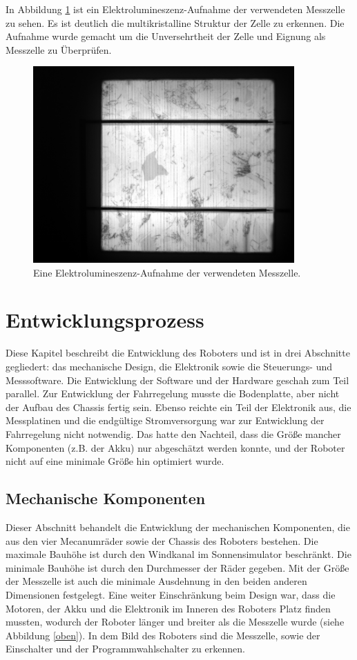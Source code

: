 \documentclass[a4paper,bibtotoc,oneside]{scrbook}
\begin{document}
\noindent In Abbildung \ref{el} ist ein Elektrolumineszenz-Aufnahme der verwendeten Messzelle zu sehen. Es ist deutlich die multikristalline Struktur der Zelle zu erkennen. Die Aufnahme wurde gemacht um die Unversehrtheit der Zelle und Eignung als Messzelle zu Überprüfen. 

\begin{figure}[htbp]
\centering
\includegraphics[width=100mm]{img/el.png}
\caption{Eine Elektrolumineszenz-Aufnahme der verwendeten Messzelle.}\label{el}
\end{figure}

\chapter{Entwicklungsprozess}\thispagestyle{empty}

Diese Kapitel beschreibt die Entwicklung des Roboters und ist in drei Abschnitte gegliedert: das mechanische Design, die Elektronik sowie die Steuerungs- und Messsoftware.
Die Entwicklung der Software und der Hardware geschah zum Teil parallel. Zur Entwicklung der Fahrregelung musste die Bodenplatte, aber nicht der Aufbau des Chassis fertig sein. Ebenso reichte ein Teil der Elektronik aus, die Messplatinen und die endgültige Stromversorgung war zur Entwicklung der Fahrregelung nicht notwendig. Das hatte den Nachteil, dass die Größe mancher Komponenten (z.B. der Akku) nur abgeschätzt werden konnte, und der Roboter nicht auf eine minimale Größe hin optimiert wurde.

\section{Mechanische Komponenten}\thispagestyle{empty}

Dieser Abschnitt behandelt die Entwicklung der mechanischen Komponenten, die aus den vier Mecanumräder sowie der Chassis des Roboters bestehen. Die maximale Bauhöhe ist durch den Windkanal im Sonnensimulator beschränkt. Die minimale Bauhöhe ist durch den Durchmesser der Räder gegeben.
Mit der Größe der Messzelle ist auch die minimale Ausdehnung in den beiden anderen Dimensionen festgelegt. Eine weiter Einschränkung beim Design war, dass die Motoren, der Akku und die Elektronik im Inneren des Roboters Platz finden mussten, wodurch der Roboter länger und breiter als die Messzelle wurde (siehe Abbildung \ref{oben}). In dem Bild des Roboters sind die Messzelle, sowie der Einschalter und der Programmwahlschalter zu erkennen.
\end{document}
